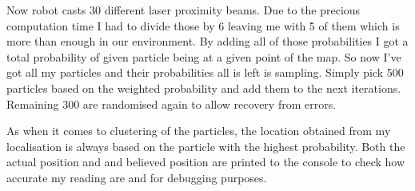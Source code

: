 \documentclass[a4paper]{article}
\begin{document}
Now robot casts 30 different laser proximity beams. Due to the precious computation time I had to divide those by 6 leaving me with 5 of them \textendash{} which is more than enough in our environment. By adding all of those probabilities I got a total probability of given particle being at a given point of the map. So now I've got all my particles and their probabilities \textendash{} all is left is sampling. Simply pick 500 particles based on the weighted probability and add them to the next iterations. Remaining 300 are randomised again to allow recovery from errors.

As when it comes to clustering of the particles, the location obtained from my localisation is always based on the particle with the highest probability. Both the actual position and and believed position are printed to the console to check how accurate my reading are and for debugging purposes.





\end{document}
